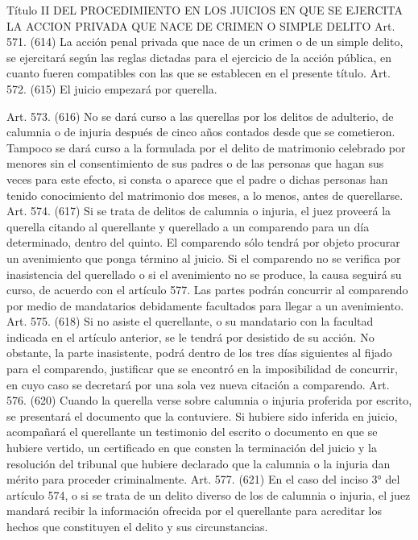     Título II
    DEL PROCEDIMIENTO EN LOS JUICIOS EN QUE SE EJERCITA
LA ACCION PRIVADA QUE NACE DE CRIMEN O SIMPLE DELITO
    Art. 571. (614) La acción penal privada que nace de un crimen o de un simple delito, se ejercitará según las reglas dictadas para el ejercicio de la acción pública, en cuanto fueren compatibles con las que se establecen en el presente título.
    Art. 572. (615) El juicio empezará por querella.

    Art. 573. (616) No se dará curso a las querellas por los delitos de adulterio, de calumnia o de injuria después de cinco años contados desde que se cometieron.
    Tampoco se dará curso a la formulada por el delito de matrimonio celebrado por menores sin el consentimiento de sus padres o de las personas que hagan sus veces para este efecto, si consta o aparece que el padre o dichas personas han tenido conocimiento del matrimonio dos meses, a lo menos, antes de querellarse.
    Art. 574. (617) Si se trata de delitos de calumnia o injuria, el juez proveerá la querella citando al querellante y querellado a un comparendo para un día determinado, dentro del quinto.
    El comparendo sólo tendrá por objeto procurar un avenimiento que ponga término al juicio.
    Si el comparendo no se verifica por inasistencia del querellado o si el avenimiento no se produce, la causa seguirá su curso, de acuerdo con el artículo 577.
    Las partes podrán concurrir al comparendo por medio de mandatarios debidamente facultados para llegar a un avenimiento.
    Art. 575. (618) Si no asiste el querellante, o su mandatario con la facultad indicada en el artículo anterior, se le tendrá por desistido de su acción.
    No obstante, la parte inasistente, podrá dentro de los tres días siguientes al fijado para el comparendo, justificar que se encontró en la imposibilidad de concurrir, en cuyo caso se decretará por una sola vez nueva citación a comparendo.
    Art. 576. (620) Cuando la querella verse sobre calumnia o injuria proferida por escrito, se presentará el documento que la contuviere.
    Si hubiere sido inferida en juicio, acompañará el querellante un testimonio del escrito o documento en que se hubiere vertido, un certificado en que consten la terminación del juicio y la resolución del tribunal que hubiere declarado que la calumnia o la injuria dan mérito para proceder criminalmente.
    Art. 577. (621) En el caso del inciso 3° del artículo 574, o si se trata de un delito diverso de los de calumnia o injuria, el juez mandará recibir la información ofrecida por el querellante para acreditar los hechos que constituyen el delito y sus circunstancias.

